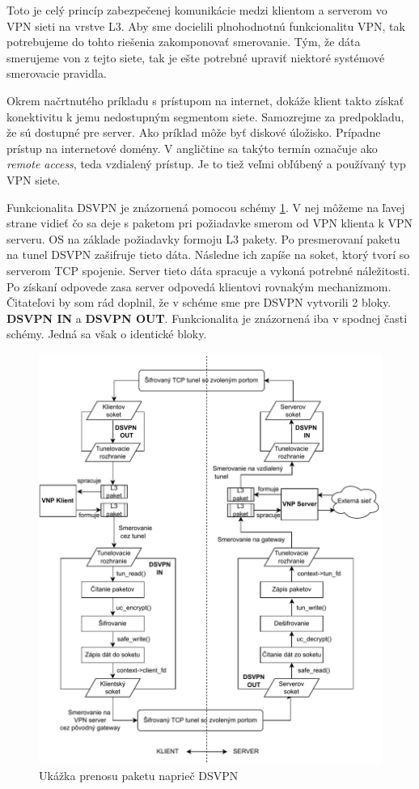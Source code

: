 Toto je celý princíp zabezpečenej komunikácie medzi klientom a serverom vo VPN sieti na vrstve L3. Aby sme docielili plnohodnotnú funkcionalitu VPN, tak potrebujeme do tohto riešenia zakomponovať smerovanie. Tým, že dáta smerujeme von z tejto siete, tak je ešte potrebné upraviť niektoré systémové smerovacie pravidla.      

Okrem načrtnutého príkladu s prístupom na internet, dokáže klient takto získať konektivitu k jemu nedostupným segmentom siete. Samozrejme za predpokladu, že sú dostupné pre server. Ako príklad môže byť diskové úložisko. Prípadne prístup na internetové domény. V angličtine sa takýto termín označuje ako \textit{remote access}, teda vzdialený prístup. Je to tiež veľmi obľúbený a používaný typ VPN siete. 

Funkcionalita DSVPN je znázornená pomocou schémy \ref{dsvpnarch}. V nej môžeme na ľavej strane vidieť čo sa deje s paketom pri požiadavke smerom od VPN klienta k VPN serveru. OS na základe požiadavky formoju L3 pakety. Po presmerovaní paketu na tunel DSVPN zašifruje tieto dáta. Následne ich zapíše na soket, ktorý tvorí so serverom TCP spojenie. Server tieto dáta spracuje a vykoná potrebné náležitosti. Po získaní odpovede zasa server odpovedá klientovi rovnakým mechanizmom. Čitateľovi by som rád doplnil, že v schéme sme pre DSVPN vytvorili 2 bloky. \textbf{DSVPN IN} a \textbf{DSVPN OUT}. Funkcionalita je znázornená iba v spodnej časti schémy. Jedná sa však o identické bloky.
\begin{figure}[h!]
	\centering
	\includegraphics[width=1.1\textwidth]{figures/dsvpn.pdf}
	\caption{Ukážka prenosu paketu naprieč DSVPN}
	\label{dsvpnarch}
\end{figure}


